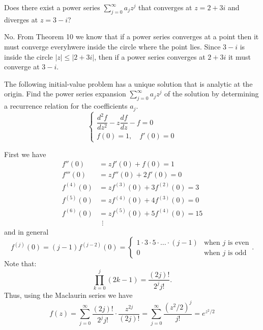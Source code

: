 \documentclass[12pt]{article}
\author{Warren Atkison}
\date{\today}
\newenvironment{exercise}[2][Exercise]{\begin{trivlist}
\item[\hskip \labelsep {\bfseries #1} \hskip \labelsep {\bfseries #2.}]}{\end{trivlist}}
\begin{document}
\fancyhf{}
\fancyhead[R]{\today}
\fancyfoot[R]{\thepage}

\begin{exercise}{4}
	Does there exist a power series $\sum_{j=0}^{\infty} a_jz^j$ that converges at $z = 2 + 3i$ and diverges at $z = 3-i$?
\end{exercise}

No. From Theorem 10 we know that if a power series converges at a point then it must converge everyhwere inside the circle where the point lies. Since $3 - i$ is inside the circle $|z| \le |2 + 3i|$, then if a power series converges at $2 + 3i$ it must converge at $3 - i$.

\begin{exercise}{13a}
	The following initial-value problem has a unique solution that is analytic at the origin. Find the power series expansion $\sum_{j=0}^{\infty} a_jz^j$ of the solution by determining a recurrence relation for the coefficients $a_j$.
	\[
		\begin{cases}
			\dfrac{d^2f}{dz^2} - z\dfrac{df}{dz} - f = 0 \\
			f(0) = 1, \quad f'(0) = 0
		\end{cases}
	\]
\end{exercise}
First we have
\begin{align*}
	f''(0) &= zf'(0) + f(0) = 1 \\
	f'''(0) &= zf''(0) + 2f'(0) = 0 \\
	f^{(4)}(0) &= zf^{(3)}(0) + 3f^{(2)}(0) = 3 \\
	f^{(5)}(0) &= zf^{(4)}(0) + 4f^{(3)}(0) = 0 \\
	f^{(6)}(0) &= zf^{(5)}(0) + 5f^{(4)}(0) = 15 \\
		   &~ ~\vdots
\end{align*}
and in general
\[
	f^{(j)}(0) = (j-1)f^{(j-2)}(0) = \begin{cases}
		1 \cdot 3 \cdot 5 \cdot \ldots \cdot (j-1) & \text{when $j$ is even} \\
		0 & \text{when $j$ is odd}
	\end{cases}.
\]
Note that:
\[
	\prod_{k=0}^j (2k - 1) = \frac{(2j)!}{2^jj!}.
\]
Thus, using the Maclaurin series we have
\[
	f(z) = \sum_{j=0}^{\infty} \frac{(2j)!}{2^jj!}\cdot\frac{z^{2j}}{(2j)!} = \sum_{j=0}^{\infty} \frac{(z^2/2)^j}{j!} = e^{z^2/2}
\]
\end{document}
